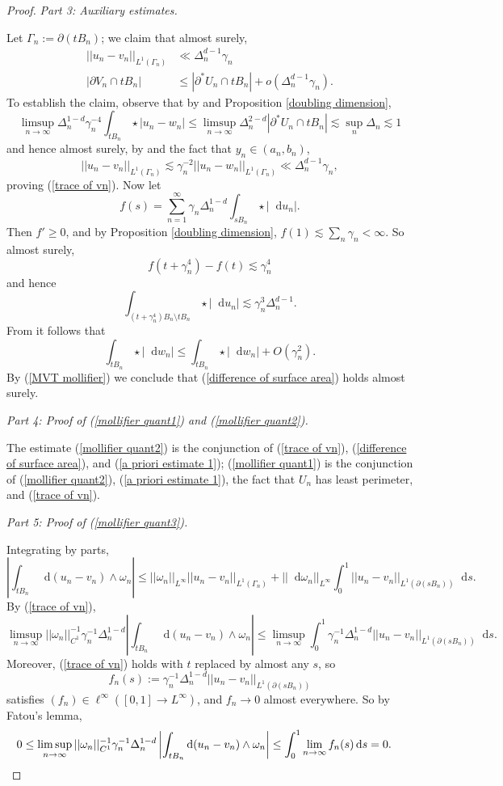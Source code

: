 \documentclass[reqno,12pt,letterpaper]{amsart}
\newcommand*\dif{\mathop{}\!\mathrm{d}}
\theoremstyle{definition}
\newcommand{\proofpart}[2]{%
  \par
  \addvspace{\medskipamount}%
  \noindent\emph{Part #1: #2.}
}
\numberwithin{equation}{section}
\begin{document}
\begin{proof}
\proofpart{3}{Auxiliary estimates}
Let $\Gamma_n := \partial(tB_n)$; we claim that almost surely,
\begin{align}
||u_n - v_n||_{L^1(\Gamma_n)} &\ll \Delta_n^{d - 1} \gamma_n \label{trace of vn} \\
|\partial V_n \cap tB_n| &\leq |\partial^* U_n \cap tB_n| + o(\Delta_n^{d - 1} \gamma_n). \label{difference of surface area}
\end{align}
To establish the claim, observe that by \cite[Lemma 7.2]{Giusti77} and Proposition \ref{doubling dimension},
$$\limsup_{n \to \infty} \Delta_n^{1 - d} \gamma_n^{-4} \int_{tB_n} \star |u_n - w_n| \leq \limsup_{n \to \infty} \Delta_n^{2-d} |\partial^* U_n \cap tB_n| \lesssim \sup_n \Delta_n \lesssim 1$$
and hence almost surely, by \cite[Lemma 1.25]{Giusti77} and the fact that $y_n \in (a_n, b_n)$,
$$||u_n - v_n||_{L^1(\Gamma_n)} \lesssim \gamma_n^{-2} ||u_n - w_n||_{L^1(\Gamma_n)} \ll \Delta_n^{d - 1} \gamma_n,$$
proving (\ref{trace of vn}).
Now let
$$f(s) = \sum_{n=1}^\infty \gamma_n \Delta_n^{1 - d} \int_{sB_n} \star |\dif u_n|.$$
Then $f' \geq 0$, and by Proposition \ref{doubling dimension}, $f(1) \lesssim \sum_n \gamma_n < \infty$.
So almost surely,
$$f(t + \gamma_n^4) - f(t) \lesssim \gamma_n^4$$
and hence
$$\int_{(t + \gamma_n^4)B_n \setminus tB_n} \star |\dif u_n| \lesssim \gamma_n^3 \Delta_n^{d - 1}.$$
From \cite[Lemma 7.2]{Giusti77} it follows that
$$\int_{tB_n} \star |\dif w_n| \leq \int_{tB_n} \star |\dif w_n| + O(\gamma_n^2).$$
By (\ref{MVT mollifier}) we conclude that (\ref{difference of surface area}) holds almost surely.

\proofpart{4}{Proof of (\ref{mollifier quant1}) and (\ref{mollifier quant2})}
The estimate (\ref{mollifier quant2}) is the conjunction of (\ref{trace of vn}), (\ref{difference of surface area}), and (\ref{a priori estimate 1}); (\ref{mollifier quant1}) is the conjunction of (\ref{mollifier quant2}), (\ref{a priori estimate 1}), the fact that $U_n$ has least perimeter, and (\ref{trace of vn}).

\proofpart{5}{Proof of (\ref{mollifier quant3})}
Integrating by parts,
$$\left|\int_{tB_n} \dif (u_n - v_n) \wedge \omega_n\right| \leq ||\omega_n||_{L^\infty} ||u_n - v_n||_{L^1(\Gamma_n)} + ||\dif \omega_n||_{L^\infty} \int_0^1 ||u_n - v_n||_{L^1(\partial(sB_n))} \dif s.$$
By (\ref{trace of vn}),
$$\limsup_{n \to \infty} ||\omega_n||_{C^1}^{-1} \gamma_n^{-1} \Delta_n^{1 - d} \left|\int_{tB_n} \dif(u_n - v_n) \wedge \omega_n\right| \leq \limsup_{n \to \infty} \int_0^1 \gamma_n^{-1} \Delta_n^{1 - d} ||u_n - v_n||_{L^1(\partial(sB_n))} \dif s.$$
Moreover, (\ref{trace of vn}) holds with $t$ replaced by almost any $s$, so
$$f_n(s) := \gamma_n^{-1} \Delta_n^{1 - d} ||u_n - v_n||_{L^1(\partial(sB_n))}$$
satisfies $(f_n) \in \ell^\infty([0, 1] \to L^\infty)$, and $f_n \to 0$ almost everywhere.
So by Fatou's lemma,
\begin{align*}
0 \leq \limsup_{n \to \infty} ||\omega_n||_{C^1}^{-1} \gamma_n^{-1} \Delta_n^{1 - d} \left|\int_{tB_n} \dif(u_n - v_n) \wedge \omega_n\right| &\leq \int_0^1 \lim_{n \to \infty} f_n(s) \dif s = 0. \qedhere
\end{align*}
\end{proof}
\end{document}
